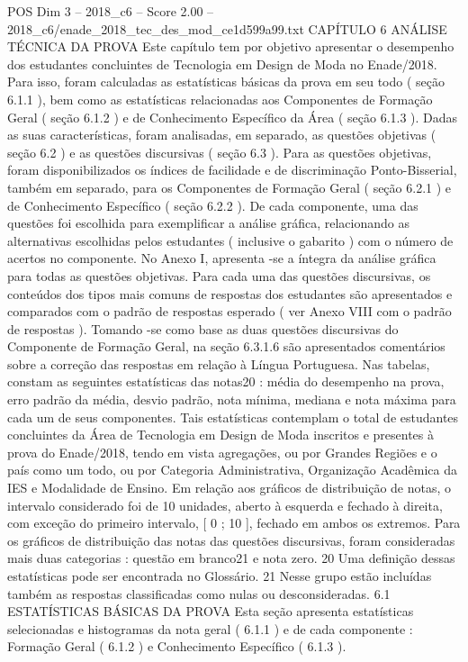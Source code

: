 \begin{textsample}{POS Dim 3 – 2018\_c6 – Score 2.00 – 2018\_c6/enade\_2018\_tec\_des\_mod\_ce1d599a99.txt}  \label{ex:f3_pos_113}
CAPÍTULO 6 ANÁLISE TÉCNICA DA PROVA Este capítulo tem por objetivo apresentar o desempenho dos estudantes concluintes de Tecnologia em Design de Moda no Enade/2018.
Para isso, foram calculadas as estatísticas básicas da prova em seu todo ( seção 6.1.1 ), bem como as estatísticas relacionadas aos Componentes de Formação Geral ( seção 6.1.2 ) e de Conhecimento Específico da Área ( seção 6.1.3 ).
Dadas as suas características, foram analisadas, em separado, as questões objetivas ( seção 6.2 ) e as questões discursivas ( seção 6.3 ).
Para as questões objetivas, foram disponibilizados os índices de facilidade e de discriminação Ponto-Bisserial, também em separado, para os Componentes de Formação Geral ( seção 6.2.1 ) e de Conhecimento Específico ( seção 6.2.2 ).
De cada componente, uma das questões foi escolhida para exemplificar a análise gráfica, relacionando as alternativas escolhidas pelos estudantes ( inclusive o gabarito ) com o número de acertos no componente.
No Anexo I, apresenta -se a íntegra da análise gráfica para todas as questões objetivas.
Para cada uma das questões discursivas, os conteúdos dos tipos mais comuns de respostas dos estudantes são apresentados e comparados com o padrão de respostas esperado ( ver Anexo VIII com o padrão de respostas ).
Tomando -se como base as duas questões discursivas do Componente de Formação Geral, na seção 6.3.1.6 são apresentados comentários sobre a correção das respostas em relação à Língua Portuguesa.
Nas tabelas, constam as seguintes estatísticas das notas20 : média do desempenho na prova, erro padrão da média, desvio padrão, nota mínima, mediana e nota máxima para cada um de seus componentes.
Tais estatísticas contemplam o total de estudantes concluintes da Área de Tecnologia em Design de Moda inscritos e presentes à prova do Enade/2018, tendo em vista agregações, ou por Grandes Regiões e o país como um todo, ou por Categoria Administrativa, Organização Acadêmica da IES e Modalidade de Ensino.
Em relação aos gráficos de distribuição de notas, o intervalo considerado foi de 10 unidades, aberto à esquerda e fechado à direita, com exceção do primeiro intervalo, [ 0 ; 10 ], fechado em ambos os extremos.
Para os gráficos de distribuição das notas das questões discursivas, foram consideradas mais duas categorias : questão em branco21 e nota zero. 20 Uma definição dessas estatísticas pode ser encontrada no Glossário. 21 Nesse grupo estão incluídas também as respostas classificadas como nulas ou desconsideradas. 6.1 ESTATÍSTICAS BÁSICAS DA PROVA Esta seção apresenta estatísticas selecionadas e histogramas da nota geral ( 6.1.1 ) e de cada componente : Formação Geral ( 6.1.2 ) e Conhecimento Específico ( 6.1.3 ).

\end{textsample}
